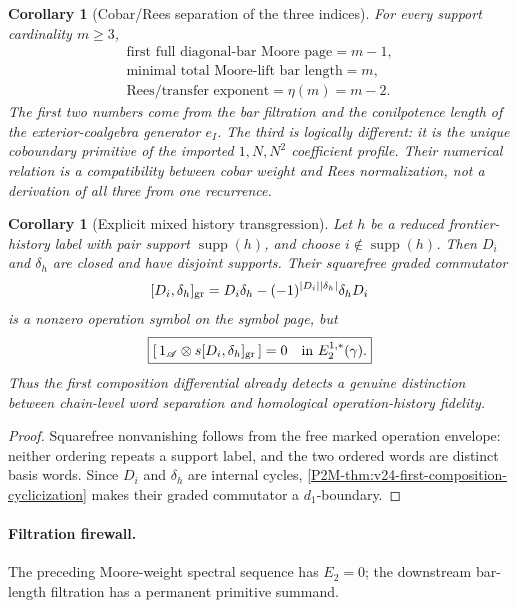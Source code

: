 \documentclass[11pt]{article}
\newtheorem{corollary}[theorem]{Corollary}
\theoremstyle{remark}
\newcommand{\supp}{\operatorname{supp}}
\begin{document}
\begin{corollary}[Cobar/Rees separation of the three indices]
\label{P2M-cor:v28-closed-bar-transfer-triangle}
For every support cardinality \(m\ge3\),
\[
 \boxed{
 \begin{array}{c}
 \text{first full diagonal-bar Moore page}=m-1,\\[1mm]
 \text{minimal total Moore-lift bar length}=m,\\[1mm]
 \text{Rees/transfer exponent}=\eta(m)=m-2.
 \end{array}}
\]
The first two numbers come from the bar filtration and the conilpotence
length of the exterior-coalgebra generator \(e_I\).  The third is logically
different: it is the unique coboundary primitive of the imported
\(1,N,N^2\) coefficient profile.  Their numerical relation is a compatibility
between cobar weight and Rees normalization, not a derivation of all three
from one recurrence.
\end{corollary}

\begin{corollary}[Explicit mixed history transgression]
\label{P2M-cor:v24-mixed-history-transgression}
Let \(h\) be a reduced frontier-history label with pair support
\(\supp(h)\), and choose \(i\notin\supp(h)\).  Then
\(D_i\) and \(\delta_h\) are closed and have disjoint supports.  Their
squarefree graded commutator
\[
 [D_i,\delta_h]_{\rm gr}
 =
 D_i\delta_h-
 (-1)^{|D_i||\delta_h|}\delta_hD_i
\]
is a nonzero operation symbol on the symbol page, but
\begin{equation}
 \boxed{
 [\,1_{\mathscr A}\otimes
 s[D_i,\delta_h]_{\rm gr}\,]
 =0
 \quad\text{in }E_2^{1,*}(\gamma).}
\end{equation}
Thus the first composition differential already detects a genuine distinction
between chain-level word separation and homological operation-history
fidelity.
\end{corollary}

\begin{proof}
Squarefree nonvanishing follows from the free marked operation envelope:
neither ordering repeats a support label, and the two ordered words are
distinct basis words.  Since \(D_i\) and \(\delta_h\) are internal cycles,
\cref{P2M-thm:v24-first-composition-cyclicization} makes their graded commutator
a \(d_1\)-boundary.
\end{proof}

\paragraph{Filtration firewall.}
The preceding Moore-weight spectral sequence has \(E_2=0\); the downstream
bar-length filtration has a permanent primitive summand.
\end{document}

